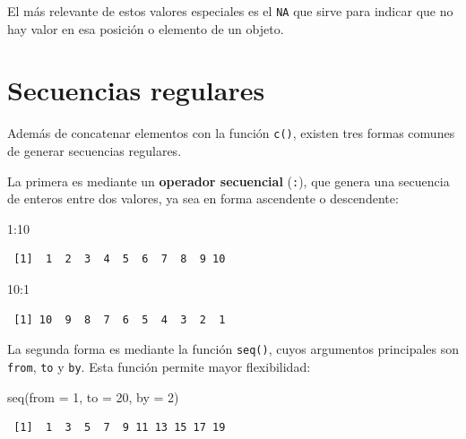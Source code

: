 \documentclass[
  spanish,
  a4paper,
]{scrbook}
\newenvironment{Shaded}{\begin{snugshade}}{\end{snugshade}}
\newcommand{\AttributeTok}[1]{\textcolor[rgb]{0.40,0.45,0.13}{#1}}
\newcommand{\DecValTok}[1]{\textcolor[rgb]{0.68,0.00,0.00}{#1}}
\newcommand{\FunctionTok}[1]{\textcolor[rgb]{0.28,0.35,0.67}{#1}}
\newcommand{\NormalTok}[1]{\textcolor[rgb]{0.00,0.23,0.31}{#1}}
\newcommand{\SpecialCharTok}[1]{\textcolor[rgb]{0.37,0.37,0.37}{#1}}
\begin{document}
El más relevante de estos valores especiales es el \texttt{NA} que sirve
para indicar que no hay valor en esa posición o elemento de un objeto.

\section{Secuencias regulares}\label{secuencias-regulares}

Además de concatenar elementos con la función \texttt{c()}, existen tres
formas comunes de generar secuencias regulares.

La primera es mediante un \textbf{operador secuencial} (\texttt{:}), que
genera una secuencia de enteros entre dos valores, ya sea en forma
ascendente o descendente:

\begin{Shaded}
\begin{Highlighting}[]
\DecValTok{1}\SpecialCharTok{:}\DecValTok{10}
\end{Highlighting}
\end{Shaded}

\begin{verbatim}
 [1]  1  2  3  4  5  6  7  8  9 10
\end{verbatim}

\begin{Shaded}
\begin{Highlighting}[]
\DecValTok{10}\SpecialCharTok{:}\DecValTok{1}
\end{Highlighting}
\end{Shaded}

\begin{verbatim}
 [1] 10  9  8  7  6  5  4  3  2  1
\end{verbatim}

La segunda forma es mediante la función \texttt{seq()}, cuyos argumentos
principales son \texttt{from}, \texttt{to} y \texttt{by}. Esta función
permite mayor flexibilidad:

\begin{Shaded}
\begin{Highlighting}[]
\FunctionTok{seq}\NormalTok{(}\AttributeTok{from =} \DecValTok{1}\NormalTok{, }\AttributeTok{to =} \DecValTok{20}\NormalTok{, }\AttributeTok{by =} \DecValTok{2}\NormalTok{)}
\end{Highlighting}
\end{Shaded}

\begin{verbatim}
 [1]  1  3  5  7  9 11 13 15 17 19
\end{verbatim}
\end{document}
